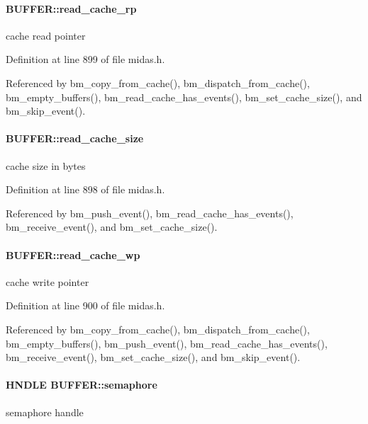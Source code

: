 \paragraph[{read\_\-cache\_\-rp}]{ {\bf BUFFER::read\_\-cache\_\-rp}}\hfill\label{structBUFFER_a1c3ec0bf54a65a805455b0cb522d8fea}
cache read pointer 

Definition at line 899 of file midas.h.

Referenced by bm\_\-copy\_\-from\_\-cache(), bm\_\-dispatch\_\-from\_\-cache(), bm\_\-empty\_\-buffers(), bm\_\-read\_\-cache\_\-has\_\-events(), bm\_\-set\_\-cache\_\-size(), and bm\_\-skip\_\-event().
\paragraph[{read\_\-cache\_\-size}]{ {\bf BUFFER::read\_\-cache\_\-size}}\hfill\label{structBUFFER_aacd1ded35cffe15d8607b92875036bf5}
cache size in bytes 

Definition at line 898 of file midas.h.

Referenced by bm\_\-push\_\-event(), bm\_\-read\_\-cache\_\-has\_\-events(), bm\_\-receive\_\-event(), and bm\_\-set\_\-cache\_\-size().
\paragraph[{read\_\-cache\_\-wp}]{ {\bf BUFFER::read\_\-cache\_\-wp}}\hfill\label{structBUFFER_ab83ba3496676cf0cafe65c78bcb9a049}
cache write pointer 

Definition at line 900 of file midas.h.

Referenced by bm\_\-copy\_\-from\_\-cache(), bm\_\-dispatch\_\-from\_\-cache(), bm\_\-empty\_\-buffers(), bm\_\-push\_\-event(), bm\_\-read\_\-cache\_\-has\_\-events(), bm\_\-receive\_\-event(), bm\_\-set\_\-cache\_\-size(), and bm\_\-skip\_\-event().
\paragraph[{semaphore}]{\setlength{\rightskip}{0pt plus 5cm}HNDLE {\bf BUFFER::semaphore}}\hfill\label{structBUFFER_a01ca98491bd74578416427054075fc3d}
semaphore handle 

